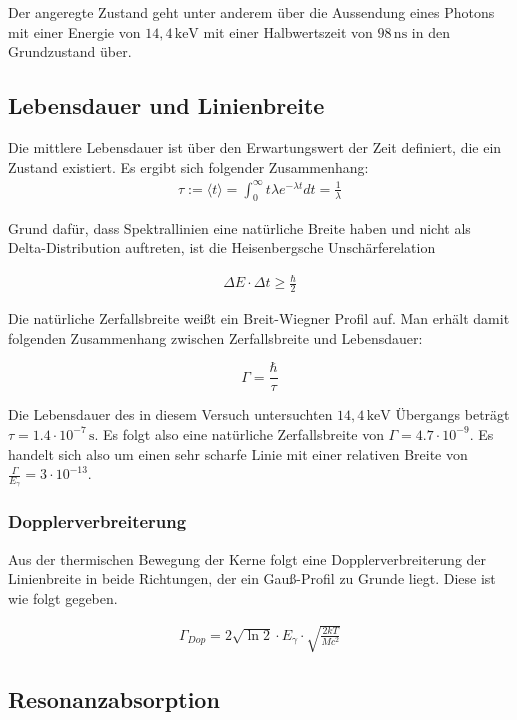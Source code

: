 Der angeregte Zustand geht unter anderem über die Aussendung eines Photons mit einer Energie von $14,4\,\mathrm{keV}$ mit einer Halbwertszeit von $98\,\mathrm{ns}$ in den Grundzustand über.

\subsection{Lebensdauer und Linienbreite}

Die mittlere Lebensdauer ist über den Erwartungswert der Zeit definiert, die ein Zustand existiert. Es ergibt sich folgender Zusammenhang:
\begin{align}
\tau:=\langle t\rangle=\int_{0}^{\infty}t\lambda e^{-\lambda t}dt=\frac{1}{\lambda} 
\end{align}

Grund dafür, dass Spektrallinien eine natürliche Breite haben und nicht als Delta-Distribution auftreten, ist die Heisenbergsche Unschärferelation

\begin{align}
\Delta E\cdot\Delta t\geq\frac{\hbar}{2}
\end{align}


Die natürliche Zerfallsbreite weißt ein Breit-Wiegner Profil auf. Man erhält damit folgenden Zusammenhang zwischen Zerfallsbreite und Lebensdauer:

\[\Gamma=\frac{\hbar}{\tau}\]


Die Lebensdauer des in diesem Versuch untersuchten $14,4\,\mathrm{keV}$ Übergangs beträgt  $\tau = 1.4\cdot 10^{-7}\,\mathrm{s}$. Es folgt also eine natürliche Zerfallsbreite von $\Gamma = 4.7\cdot 10^{-9}$. Es handelt sich also um einen sehr scharfe Linie mit einer relativen Breite von $\frac{\Gamma}{E_{\gamma}}=3\cdot 10^{-13}$.


\subsubsection{Dopplerverbreiterung}

Aus der thermischen Bewegung der Kerne folgt eine Dopplerverbreiterung der Linienbreite in beide Richtungen, der ein Gauß-Profil zu Grunde liegt. Diese ist wie folgt gegeben.

\begin{align}
\Gamma_{Dop} = 2\sqrt{\ln2}\cdot E_{\gamma}\cdot\sqrt{\frac{2kT}{Mc^2}}
\end{align}



\subsection{Resonanzabsorption}

